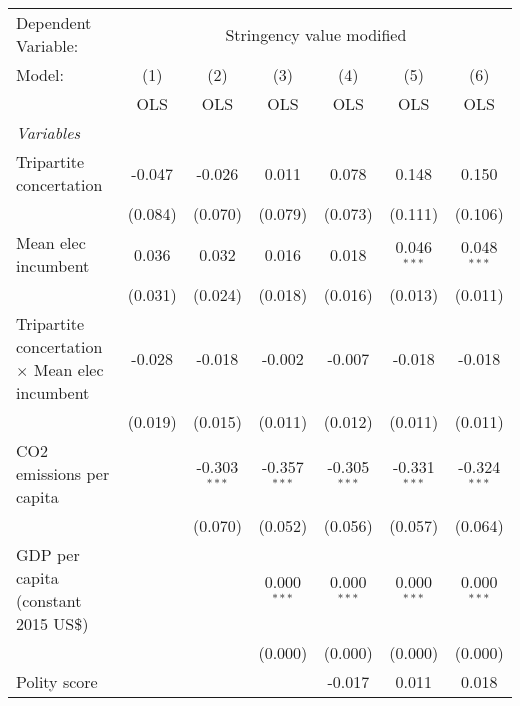 
\begingroup
\centering
\begin{tabular}{lcccccc}
   \toprule
   Dependent Variable: & \multicolumn{6}{c}{Stringency value modified}\\
   Model:                                                & (1)     & (2)            & (3)            & (4)            & (5)            & (6)\\  
                                                         &  OLS    & OLS            & OLS            & OLS            & OLS            & OLS\\  
   \midrule
   \emph{Variables}\\
   Tripartite concertation                               & -0.047  & -0.026         & 0.011          & 0.078          & 0.148          & 0.150\\   
                                                         & (0.084) & (0.070)        & (0.079)        & (0.073)        & (0.111)        & (0.106)\\   
   Mean elec incumbent                                   & 0.036   & 0.032          & 0.016          & 0.018          & 0.046$^{***}$  & 0.048$^{***}$\\   
                                                         & (0.031) & (0.024)        & (0.018)        & (0.016)        & (0.013)        & (0.011)\\   
   Tripartite concertation $\times$ Mean elec incumbent  & -0.028  & -0.018         & -0.002         & -0.007         & -0.018         & -0.018\\   
                                                         & (0.019) & (0.015)        & (0.011)        & (0.012)        & (0.011)        & (0.011)\\   
   CO2 emissions per capita                              &         & -0.303$^{***}$ & -0.357$^{***}$ & -0.305$^{***}$ & -0.331$^{***}$ & -0.324$^{***}$\\   
                                                         &         & (0.070)        & (0.052)        & (0.056)        & (0.057)        & (0.064)\\   
   GDP per capita (constant 2015 US\$)                   &         &                & 0.000$^{***}$  & 0.000$^{***}$  & 0.000$^{***}$  & 0.000$^{***}$\\   
                                                         &         &                & (0.000)        & (0.000)        & (0.000)        & (0.000)\\   
   Polity score                                          &         &                &                & -0.017         & 0.011          & 0.018\\   

\end{tabular}
